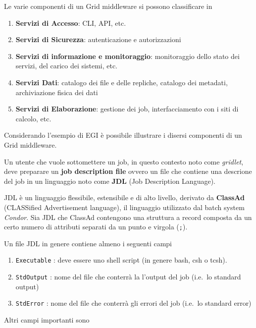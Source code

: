\documentclass[italian,]{article}
\providecommand{\tightlist}{%
  \setlength{\itemsep}{0pt}\setlength{\parskip}{0pt}}
\begin{document}
Le varie componenti di un Grid middleware si possono classificare in

\begin{enumerate}
\def\labelenumi{\arabic{enumi}.}
\tightlist
\item
  \textbf{Servizi di Accesso}: CLI, API, etc.
\item
  \textbf{Servizi di Sicurezza}: autenticazione e autorizzazioni
\item
  \textbf{Servizi di informazione e monitoraggio}: monitoraggio dello
  stato dei servizi, del carico dei sistemi, etc.
\item
  \textbf{Servizi Dati}: catalogo dei file e delle repliche, catalogo
  dei metadati, archiviazione fisica dei dati
\item
  \textbf{Servizi di Elaborazione}: gestione dei job, interfacciamento
  con i siti di calcolo, etc.
\end{enumerate}

Considerando l'esempio di EGI è possibile illustrare i disersi
componenti di un Grid middleware.

Un utente che vuole sottomettere un job, in questo contesto noto come
\emph{gridlet}, deve preparare un \textbf{job description file} ovvero
un file che contiene una descrione del job in un linguaggio noto come
\textbf{JDL} (Job Description Language).

JDL è un linguaggio flessibile, estensibile e di alto livello, derivato
da \textbf{ClassAd} (CLASSified Advertisement language), il linguaggio
utilizzato dal batch system \emph{Condor}. Sia JDL che ClassAd
contengono una struttura a record composta da un certo numero di
attributi separati da un punto e virgola (\texttt{;}).

Un file JDL in genere contiene almeno i seguenti campi

\begin{enumerate}
\def\labelenumi{\arabic{enumi}.}
\tightlist
\item
  \texttt{Executable} : deve essere uno shell script (in genere bash,
  csh o tcsh).
\item
  \texttt{StdOutput} : nome del file che conterrà la l'output del job
  (i.e.~lo standard output)
\item
  \texttt{StdError} : nome del file che conterrà gli errori del job
  (i.e.~lo standard error)
\end{enumerate}

Altri campi importanti sono
\end{document}
